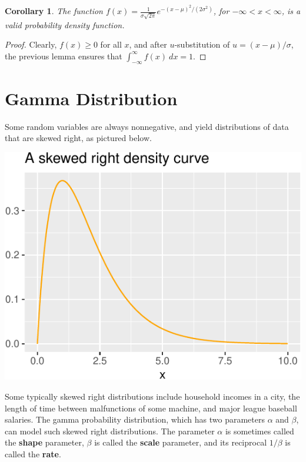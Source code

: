 \documentclass[
]{book}
\newtheorem{corollary}{Corollary}[chapter]
\theoremstyle{definition}
\theoremstyle{definition}
\theoremstyle{definition}
\theoremstyle{definition}
\theoremstyle{remark}
\begin{document}
\begin{corollary}
The function \(f(x) = \frac{1}{\sigma\sqrt{2\pi}}e^{-(x-\mu)^2/(2\sigma^2)}\), for \(-\infty < x <  \infty\), is a valid probability density function.
\end{corollary}

\begin{proof}
Clearly, \(f(x) \geq 0\) for all \(x\), and after \(u\)-substitution of \(u = (x-\mu)/\sigma\), the previous lemma ensures that \(\int_{-\infty}^\infty f(x)~dx = 1\).
\end{proof}

\section{Gamma Distribution}\label{gamma-distribution}

Some random variables are always nonnegative, and yield distributions of data that are skewed right, as pictured below.

\includegraphics{math340-notes_files/figure-latex/unnamed-chunk-22-1.pdf}

Some typically skewed right distributions include household incomes in a city, the length of time between malfunctions of some machine, and major league baseball salaries. The gamma probability distribution, which has two parameters \(\alpha\) and \(\beta\), can model such skewed right distributions. The parameter \(\alpha\) is sometimes called the \textbf{shape} parameter, \(\beta\) is called the \textbf{scale} parameter, and its reciprocal \(1/\beta\) is called the \textbf{rate}.
\end{document}

